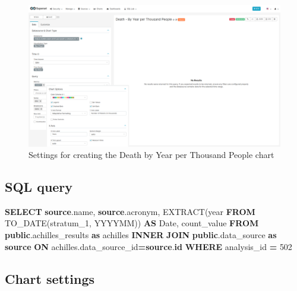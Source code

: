\documentclass[
]{book}
\newenvironment{Shaded}{\begin{snugshade}}{\end{snugshade}}
\newcommand{\DataTypeTok}[1]{\textcolor[rgb]{0.13,0.29,0.53}{#1}}
\newcommand{\DecValTok}[1]{\textcolor[rgb]{0.00,0.00,0.81}{#1}}
\newcommand{\FunctionTok}[1]{\textcolor[rgb]{0.00,0.00,0.00}{#1}}
\newcommand{\KeywordTok}[1]{\textcolor[rgb]{0.13,0.29,0.53}{\textbf{#1}}}
\newcommand{\NormalTok}[1]{#1}
\newcommand{\OperatorTok}[1]{\textcolor[rgb]{0.81,0.36,0.00}{\textbf{#1}}}
\newcommand{\StringTok}[1]{\textcolor[rgb]{0.31,0.60,0.02}{#1}}
\begin{document}
\begin{figure}
\includegraphics[width=1\linewidth]{images/07-death/03-deaths_by_year_per_thousand_people} \caption{Settings for creating the Death by Year per Thousand People chart}\label{fig:deathByYearPerThousandPeople}
\end{figure}

\hypertarget{sql-query-21}{%
\subsection{SQL query}\label{sql-query-21}}

\begin{Shaded}
\begin{Highlighting}[]
\KeywordTok{SELECT} \KeywordTok{source}\NormalTok{.name,}
    \KeywordTok{source}\NormalTok{.acronym,}
    \FunctionTok{EXTRACT}\NormalTok{(}\DataTypeTok{year} \KeywordTok{FROM} \FunctionTok{TO\_DATE}\NormalTok{(stratum\_1, }\StringTok{\textquotesingle{}YYYYMM\textquotesingle{}}\NormalTok{)) }\KeywordTok{AS} \DataTypeTok{Date}\NormalTok{,}
\NormalTok{    count\_value}
\KeywordTok{FROM} \KeywordTok{public}\NormalTok{.achilles\_results }\KeywordTok{as}\NormalTok{ achilles}
\KeywordTok{INNER} \KeywordTok{JOIN} \KeywordTok{public}\NormalTok{.data\_source }\KeywordTok{as} \KeywordTok{source} \KeywordTok{ON}\NormalTok{ achilles.data\_source\_id}\OperatorTok{=}\KeywordTok{source}\NormalTok{.}\KeywordTok{id}
\KeywordTok{WHERE}\NormalTok{ analysis\_id }\OperatorTok{=} \DecValTok{502}
\end{Highlighting}
\end{Shaded}

\hypertarget{chart-settings-21}{%
\subsection{Chart settings}\label{chart-settings-21}}
\end{document}
